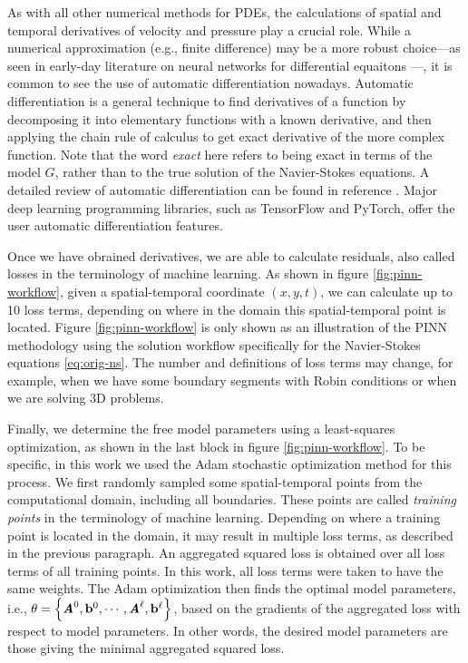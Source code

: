 As with all other numerical methods for PDEs, the calculations of spatial and temporal derivatives of velocity and pressure play a crucial role.
While a numerical approximation (e.g., finite difference) may be a more robust choice---as seen in early-day literature on neural networks for differential equaitons \cite{dissanayake_neural-network-based_1994,lagaris_artificial_1998}---, it is common to see the use of automatic differentiation nowadays.
Automatic differentiation is a general technique to find derivatives of a function by decomposing it into elementary functions with a known derivative, and then applying the chain rule of calculus to get exact derivative of the more complex function.
Note that the word {\it exact} here refers to being exact in terms of the model $G$, rather than to the true solution of the Navier-Stokes equations. 
A detailed review of automatic differentiation can be found in reference \cite{griewank_automatic_1988}.
Major deep learning programming libraries, such as TensorFlow and PyTorch, offer the user automatic differentiation features.

Once we have obrained derivatives, we are able to calculate residuals, also called losses in the terminology of machine learning.
As shown in figure \ref{fig:pinn-workflow}, given a spatial-temporal coordinate $(x, y, t)$, we can calculate up to \num{10} loss terms, depending on where in the domain this spatial-temporal point is located. 
Figure \ref{fig:pinn-workflow} is only shown as an illustration of the PINN methodology using the solution workflow specifically for the Navier-Stokes equations \eqref{eq:orig-ns}.
The number and definitions of loss terms may change, for example, when we have some boundary segments with Robin conditions or when we are solving 3D problems.

Finally, we determine the free model parameters using a least-squares optimization, as shown in the last block in figure \ref{fig:pinn-workflow}.
To be specific, in this work we used the Adam stochastic optimization method for this process. 
We first randomly sampled some spatial-temporal points from the computational domain, including all boundaries.
These points are called {\it training points} in the terminology of machine learning.
Depending on where a training point is located in the domain, it may result in multiple loss terms, as described in the previous paragraph.
An aggregated squared loss is obtained over all loss terms of all training points.
In this work, all loss terms were taken to have the same weights.
The Adam optimization then finds the optimal model parameters, i.e., $\theta=\left\{\boldsymbol{\mathit{A}}^0, \mathbf{b}^0, \cdots, \boldsymbol{\mathit{A}}^\ell, \mathbf{b}^\ell\right\}$, based on the gradients of the aggregated loss with respect to model parameters.
In other words, the desired model parameters are those giving the minimal aggregated squared loss.

